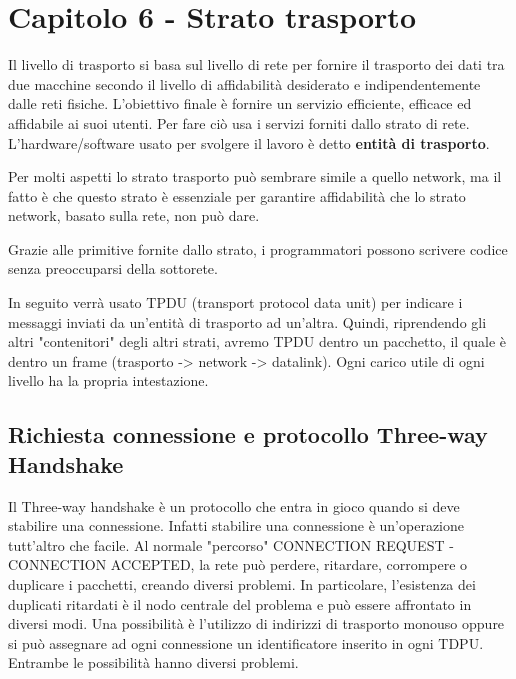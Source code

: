 \newpage
\section{Capitolo 6 - Strato trasporto}
Il livello di trasporto si basa sul livello di rete per fornire il trasporto dei dati tra due macchine secondo il livello di affidabilità desiderato e indipendentemente dalle reti fisiche. 
L'obiettivo finale è fornire un servizio efficiente, efficace ed affidabile ai suoi utenti.
Per fare ciò usa i servizi forniti dallo strato di rete. L'hardware/software usato per svolgere il lavoro è detto \textbf{entità di trasporto}.

Per molti aspetti lo strato trasporto può sembrare simile a quello network, ma il fatto è che questo strato è essenziale per garantire affidabilità che lo strato network, basato sulla rete, non può dare. 

Grazie alle primitive fornite dallo strato, i programmatori possono scrivere codice senza preoccuparsi della sottorete.

In seguito verrà usato TPDU (transport protocol data unit) per indicare i messaggi inviati da un'entità di trasporto ad un'altra. 
Quindi, riprendendo gli altri "contenitori" degli altri strati, avremo TPDU dentro un pacchetto, il quale è dentro un frame
(trasporto -> network -> datalink).
Ogni carico utile di ogni livello ha la propria intestazione. 

\subsection{Richiesta connessione e protocollo Three-way Handshake}

Il Three-way handshake è un protocollo che entra in gioco quando si deve stabilire una connessione.
Infatti stabilire una connessione è un'operazione tutt'altro che facile.
Al normale "percorso" CONNECTION REQUEST - CONNECTION ACCEPTED, la rete può perdere, ritardare, corrompere o duplicare i pacchetti, creando diversi problemi.
In particolare, l'esistenza dei duplicati ritardati è il nodo centrale del problema e può essere affrontato in diversi modi.
Una possibilità è l'utilizzo di indirizzi di trasporto monouso oppure si può assegnare ad ogni connessione un identificatore inserito in ogni TDPU.
Entrambe le possibilità hanno diversi problemi.


